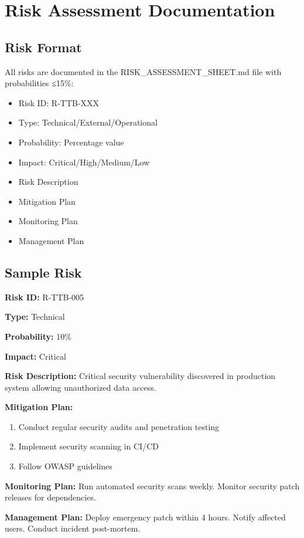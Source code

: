 \documentclass[12pt,a4paper]{report}
\begin{document}
\chapter{Risk Assessment Documentation}

\section{Risk Format}
All risks are documented in the RISK\_ASSESSMENT\_SHEET.md file with probabilities ≤15\%:
\begin{itemize}[leftmargin=*]
    \item Risk ID: R-TTB-XXX
    \item Type: Technical/External/Operational
    \item Probability: Percentage value
    \item Impact: Critical/High/Medium/Low
    \item Risk Description
    \item Mitigation Plan
    \item Monitoring Plan
    \item Management Plan
\end{itemize}

\section{Sample Risk}
\textbf{Risk ID:} R-TTB-005

\textbf{Type:} Technical

\textbf{Probability:} 10\%

\textbf{Impact:} Critical

\textbf{Risk Description:} Critical security vulnerability discovered in production system allowing unauthorized data access.

\textbf{Mitigation Plan:}
\begin{enumerate}
    \item Conduct regular security audits and penetration testing
    \item Implement security scanning in CI/CD
    \item Follow OWASP guidelines
\end{enumerate}

\textbf{Monitoring Plan:} Run automated security scans weekly. Monitor security patch releases for dependencies.

\textbf{Management Plan:} Deploy emergency patch within 4 hours. Notify affected users. Conduct incident post-mortem.
\end{document}
